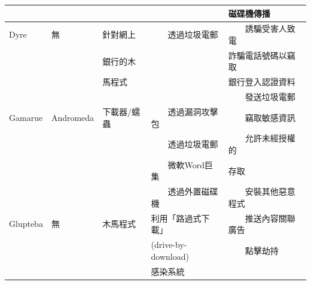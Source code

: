 \documentclass[14pt]{extarticle}
\newcommand{\tabitem}{~~\llap{\textbullet}~~}
\begin{document}
\begin{table}[!htbp]
\begin{tabular}{lllll}
 & & & & 磁碟機傳播 \\\hline
Dyre & 無 & 針對網上 & \tabitem 透過垃圾電郵 & \tabitem 誘騙受害人致電 \\
 & & 銀行的木 & & 詐騙電話號碼以竊取 \\
 & & 馬程式 & & 銀行登入認證資料 \\
 & & & & \tabitem 發送垃圾電郵 \\\hline
Gamarue & Andromeda & 下載器/蠕蟲 & \tabitem 透過漏洞攻擊包 & \tabitem 竊取敏感資訊 \\
 & & & \tabitem 透過垃圾電郵 & \tabitem 允許未經授權的 \\
 & & & \tabitem 微軟Word巨集 &  存取 \\
 & & & \tabitem 透過外置磁碟機 & \tabitem 安裝其他惡意程式 \\\hline
Glupteba & 無 & 木馬程式 & 利用「路過式下載」 & \tabitem 推送內容關聯廣告 \\
 & & & (drive-by-download) & \tabitem 	點擊劫持 \\ 
 & & & 感染系統 \\\hline

\end{tabular}
\end{table}
\end{document}
